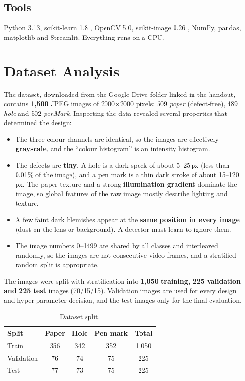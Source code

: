 \documentclass[11pt,a4paper]{report}
\begin{document}
\section{Tools}
Python 3.13, scikit-learn 1.8 \cite{sklearn}, OpenCV 5.0, scikit-image 0.26 \cite{skimage},
NumPy, pandas, matplotlib and Streamlit. Everything runs on a CPU.

\chapter{Dataset Analysis}
The dataset, downloaded from the Google Drive folder linked in the handout, contains
\textbf{1,500} JPEG images of 2000$\times$2000 pixels: 509 \emph{paper} (defect-free),
489 \emph{hole} and 502 \emph{penMark}. Inspecting the data revealed several properties that
determined the design:
\begin{itemize}
  \item The three colour channels are identical, so the images are effectively
        \textbf{grayscale}, and the ``colour histogram'' is an intensity histogram.
  \item The defects are \textbf{tiny}. A hole is a dark speck of about 5--25\,px (less than
        0.01\% of the image), and a pen mark is a thin dark stroke of about 15--120\,px.
        The paper texture and a strong \textbf{illumination gradient} dominate the image,
        so global features of the raw image mostly describe lighting and texture.
  \item A few faint dark blemishes appear at the \textbf{same position in every image}
        (dust on the lens or background). A detector must learn to ignore them.
  \item The image numbers 0--1499 are shared by all classes and interleaved randomly, so the
        images are not consecutive video frames, and a stratified random split is
        appropriate.
\end{itemize}
The images were split with stratification into \textbf{1,050 training, 225 validation and
225 test} images (70/15/15). Validation images are used for every design and
hyper-parameter decision, and the test images only for the final evaluation.

\begin{table}[H]
\centering
\caption{Dataset split.}
\begin{tabular}{lcccc}
\toprule
Split & Paper & Hole & Pen mark & Total\\
\midrule
Train & 356 & 342 & 352 & 1,050\\
Validation & 76 & 74 & 75 & 225\\
Test & 77 & 73 & 75 & 225\\
\bottomrule
\end{tabular}
\end{table}
\end{document}
